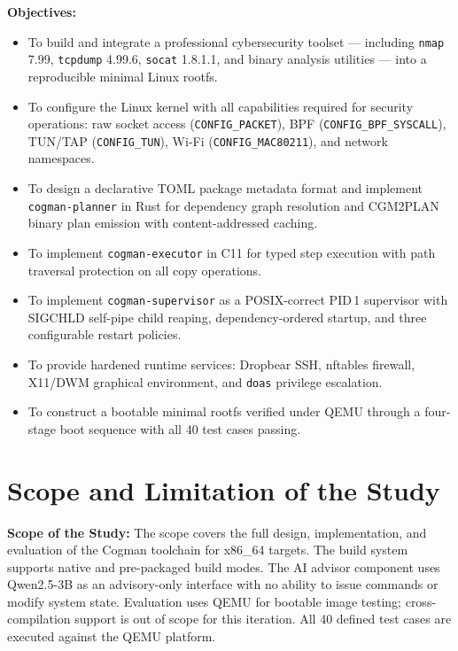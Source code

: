 \documentclass[12pt,a4paper]{report}
\begin{document}
\textbf{Objectives:}
\begin{itemize}[leftmargin=2em, itemsep=2pt]
  \item To build and integrate a professional cybersecurity toolset --- including
        \texttt{nmap} 7.99, \texttt{tcpdump} 4.99.6, \texttt{socat} 1.8.1.1,
        and binary analysis utilities --- into a reproducible minimal Linux rootfs.
  \item To configure the Linux kernel with all capabilities required for
        security operations: raw socket access (\texttt{CONFIG\_PACKET}),
        BPF (\texttt{CONFIG\_BPF\_SYSCALL}), TUN/TAP (\texttt{CONFIG\_TUN}),
        Wi-Fi (\texttt{CONFIG\_MAC80211}), and network namespaces.
  \item To design a declarative TOML package metadata format and implement
        \texttt{cogman-planner} in Rust for dependency graph resolution and
        CGM2PLAN binary plan emission with content-addressed caching.
  \item To implement \texttt{cogman-executor} in C11 for typed step execution
        with path traversal protection on all copy operations.
  \item To implement \texttt{cogman-supervisor} as a POSIX-correct PID\,1
        supervisor with SIGCHLD self-pipe child reaping, dependency-ordered
        startup, and three configurable restart policies.
  \item To provide hardened runtime services: Dropbear SSH, nftables firewall,
        X11/DWM graphical environment, and \texttt{doas} privilege escalation.
  \item To construct a bootable minimal rootfs verified under QEMU through a
        four-stage boot sequence with all 40 test cases passing.
\end{itemize}

\section{Scope and Limitation of the Study}

\textbf{Scope of the Study:}
The scope covers the full design, implementation, and evaluation of the Cogman
toolchain for x86\_64 targets. The build system supports native and pre-packaged
build modes. The AI advisor component uses Qwen2.5-3B as an advisory-only
interface with no ability to issue commands or modify system state. Evaluation
uses QEMU for bootable image testing; cross-compilation support is out of scope
for this iteration. All 40 defined test cases are executed against the QEMU
platform.
\end{document}
